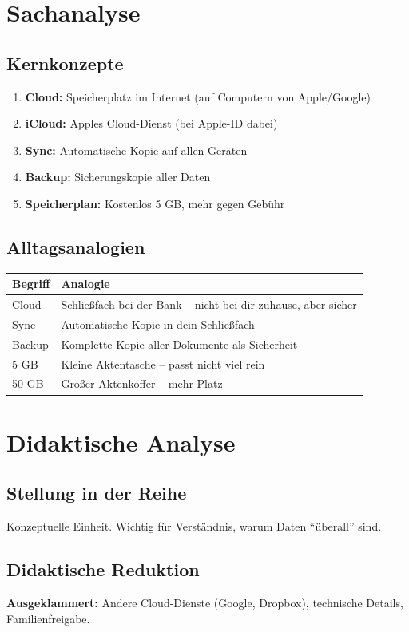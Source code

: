 \documentclass[11pt,a4paper]{article}
\begin{document}
\section{Sachanalyse}

\subsection{Kernkonzepte}
\begin{enumerate}
    \item \textbf{Cloud:} Speicherplatz im Internet (auf Computern von Apple/Google)
    \item \textbf{iCloud:} Apples Cloud-Dienst (bei Apple-ID dabei)
    \item \textbf{Sync:} Automatische Kopie auf allen Geräten
    \item \textbf{Backup:} Sicherungskopie aller Daten
    \item \textbf{Speicherplan:} Kostenlos 5 GB, mehr gegen Gebühr
\end{enumerate}

\subsection{Alltagsanalogien}
\begin{tabular}{|l|p{8cm}|}
\hline
\textbf{Begriff} & \textbf{Analogie} \\
\hline
Cloud & Schließfach bei der Bank -- nicht bei dir zuhause, aber sicher \\
Sync & Automatische Kopie in dein Schließfach \\
Backup & Komplette Kopie aller Dokumente als Sicherheit \\
5 GB & Kleine Aktentasche -- passt nicht viel rein \\
50 GB & Großer Aktenkoffer -- mehr Platz \\
\hline
\end{tabular}

\section{Didaktische Analyse}

\subsection{Stellung in der Reihe}
Konzeptuelle Einheit. Wichtig für Verständnis, warum Daten ``überall'' sind.

\subsection{Didaktische Reduktion}
\textbf{Ausgeklammert:} Andere Cloud-Dienste (Google, Dropbox), technische Details, Familienfreigabe.
\end{document}
